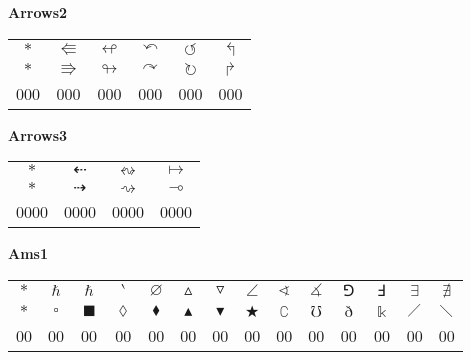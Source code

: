\documentclass[12pt]{report}
\newlength{\mine}
\newlength{\niz}
\def\pmb{}
\begin{document}
\textbf{Arrows2}
\par\nobreak\vspace{2mm}
\begin{tabular}{|c|ccccc|}
  \hline
   $\pmb *                 $&
   $\pmb\Lleftarrow        $&
   $\pmb\looparrowleft     $&
   $\pmb\curvearrowleft    $&
   $\pmb\circlearrowleft   $&
   $\pmb\Lsh               $\\[\mine]
   $\pmb *                 $&
   $\pmb\Rrightarrow       $&
   $\pmb\looparrowright    $&
   $\pmb\curvearrowright   $&
   $\pmb\circlearrowright  $&
   $\pmb\Rsh               $\\[\niz]
  \hline\hline
  000&000&000&000&000&000\\
  \hline
\end{tabular}
\goodbreak\par\vspace{3mm}

\textbf{Arrows3}
\par\nobreak\vspace{2mm}
\begin{tabular}{|c|ccc|}
  \hline
   $\pmb *                   $&
   $\pmb\dashleftarrow       $&
   $\pmb\leftrightsquigarrow $&
   $\pmb\mapsto              $\\[\mine]
   $\pmb *                   $&
   $\pmb\dashrightarrow      $&
   $\pmb\rightsquigarrow     $&
   $\pmb\multimap            $\\[\niz]
  \hline\hline
  0000&0000&0000&0000\\
  \hline
\end{tabular}
\goodbreak\par\vspace{3mm}

\newpage

\textbf{Ams1}
\par\nobreak\vspace{2mm}
\begin{tabular}{|c|ccccccccccccc|}
  \hline
   $\pmb *$&
   $\pmb\hbar $&
   $\pmb\hslash $&
   $\pmb\backprime $&
   $\pmb\varnothing $&
   $\pmb\vartriangle $&
   $\pmb\triangledown $&
   $\pmb\angle $&
   $\pmb\sphericalangle $&
   $\pmb\measuredangle $&
   $\pmb\Game$&
   $\pmb\Finv $&
   $\pmb\exists $&
   $\pmb\nexists $\\[\mine]
   $\pmb *$&
   $\pmb\square $&
   $\pmb\blacksquare $&
   $\pmb\lozenge $&
   $\pmb\blacklozenge $&
   $\pmb\blacktriangle $&
   $\pmb\blacktriangledown $&
   $\pmb\bigstar $&
   $\pmb\complement $&
   $\pmb\mho $&
   $\pmb\eth $&
   $\pmb\Bbbk $&
   $\pmb\diagup $&
   $\pmb\diagdown $\\[\niz]
  \hline\hline
  00&00&00&00&00&00&00&00&00&00&00&00&00&00\\
  \hline
\end{tabular}
\goodbreak\par\vspace{3mm}
\end{document}
